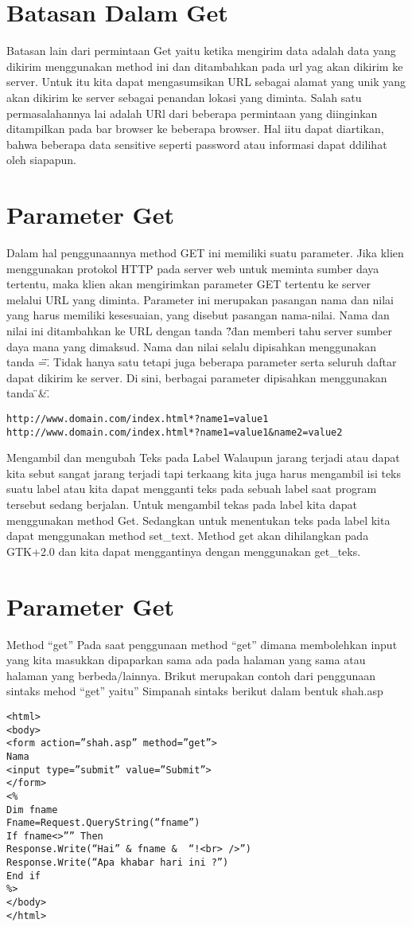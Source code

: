 \section{Batasan Dalam Get}
Batasan lain dari permintaan Get yaitu ketika mengirim data adalah data yang dikirim menggunakan method ini dan ditambahkan pada url yag 
akan dikirim ke server. Untuk itu kita dapat mengasumsikan URL sebagai alamat yang unik yang akan dikirim ke server sebagai penandan 
lokasi yang diminta. Salah satu permasalahannya lai adalah URl dari beberapa permintaan yang diinginkan ditampilkan pada bar browser ke 
beberapa browser. Hal iitu dapat diartikan, bahwa beberapa data sensitive seperti password atau informasi dapat ddilihat oleh siapapun.

\section{Parameter Get}
Dalam hal penggunaannya method GET ini memiliki suatu parameter. Jika klien menggunakan protokol HTTP pada server web untuk meminta 
sumber daya tertentu, maka klien akan mengirimkan parameter GET tertentu ke server melalui URL yang diminta. Parameter ini merupakan 
pasangan nama dan nilai yang harus memiliki kesesuaian, yang disebut pasangan nama-nilai.
Nama dan nilai ini ditambahkan ke URL dengan tanda \"?\" dan memberi tahu server sumber daya mana yang dimaksud. Nama dan nilai selalu dipisahkan menggunakan tanda \"=\". Tidak hanya satu tetapi juga beberapa parameter serta seluruh daftar dapat dikirim ke server. Di sini, berbagai parameter dipisahkan menggunakan tanda \"&\".
\begin{verbatim}
http://www.domain.com/index.html*?name1=value1
http://www.domain.com/index.html*?name1=value1&name2=value2
\end{verbatim}

Mengambil dan mengubah Teks pada Label
Walaupun jarang terjadi atau dapat kita sebut sangat jarang terjadi tapi terkaang kita juga harus mengambil isi teks suatu label atau 
kita dapat mengganti teks pada sebuah label saat program tersebut sedang berjalan.
Untuk mengambil tekas pada label kita dapat menggunakan method Get. Sedangkan untuk menentukan teks pada label kita dapat menggunakan 
method set_text. 
Method get akan dihilangkan pada GTK+2.0 dan kita dapat menggantinya dengan menggunakan get_teks.

\section{Parameter Get}
Method “get”
Pada saat penggunaan method “get” dimana membolehkan input yang kita masukkan dipaparkan sama ada pada halaman yang sama atau halaman 
 yang berbeda/lainnya. Brikut merupakan contoh dari penggunaan sintaks mehod “get” yaitu”
Simpanah sintaks berikut dalam bentuk shah.asp
\begin{verbatim}
<html>
<body>
<form action=”shah.asp” method=”get”>
Nama
<input type=”submit” value=”Submit”>
</form>
<%
Dim fname
Fname=Request.QueryString(“fname”)
If fname<>”” Then
Response.Write(“Hai” & fname &  “!<br> />”)
Response.Write(“Apa khabar hari ini ?”)
End if
%>
</body>
</html>
\end{verbatim}

